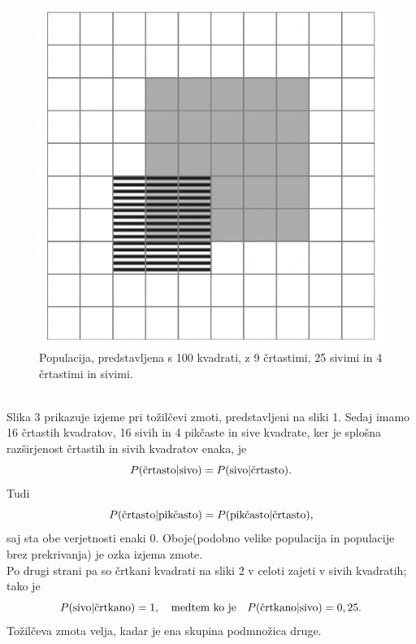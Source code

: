 \documentclass[fin1, tisk]{fmfdelo}
\theoremstyle{definition}
\theoremstyle{trditev}
\theoremstyle{izrek}
\begin{document}
\begin{figure}[!ht]\label{fig:slika1}
   \centering
   \includegraphics[scale=0.45]{slika1.png}
   \caption{Populacija, predstavljena s 100 kvadrati, z 9 črtastimi, 25 sivimi in 4 črtastimi in sivimi.}\vspace{2mm}
\end{figure}\\
Slika 3 prikazuje izjeme pri tožilčevi zmoti, predstavljeni na sliki 1. Sedaj imamo 16 črtastih kvadratov, 16 sivih in 4 pikčaste in sive kvadrate, ker je splošna
razširjenost črtastih in sivih kvadratov enaka, je
\[
   P(\text{črtasto} \lvert \text{sivo}) = P(\text{sivo} \lvert \text{črtasto}). \vspace{2mm}
\]
Tudi
\[
   P(\text{črtasto} \lvert \text{pikčasto}) = P(\text{pikčasto} \lvert \text{črtasto}), \vspace{2mm}
\]
saj sta obe verjetnosti enaki $0$. Oboje(podobno velike populacija in populacije brez prekrivanja) je ozka izjema zmote. \\
Po drugi strani pa so črtkani kvadrati na sliki 2 v celoti zajeti v sivih kvadratih; tako je
\[
   P(\text{sivo} \lvert \text{črtkano}) = 1, \quad \text{medtem ko je} \quad P(\text{črtkano} \lvert \text{sivo}) = 0,25. \vspace{2mm}
\]
Tožilčeva zmota velja, kadar je ena skupina podmnožica druge. 
\end{document}
